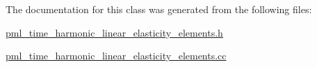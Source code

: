 The documentation for this class was generated from the following files\+:\begin{DoxyCompactItemize}
\item 
\hyperlink{pml__time__harmonic__linear__elasticity__elements_8h}{pml\+\_\+time\+\_\+harmonic\+\_\+linear\+\_\+elasticity\+\_\+elements.\+h}\item 
\hyperlink{pml__time__harmonic__linear__elasticity__elements_8cc}{pml\+\_\+time\+\_\+harmonic\+\_\+linear\+\_\+elasticity\+\_\+elements.\+cc}\end{DoxyCompactItemize}
